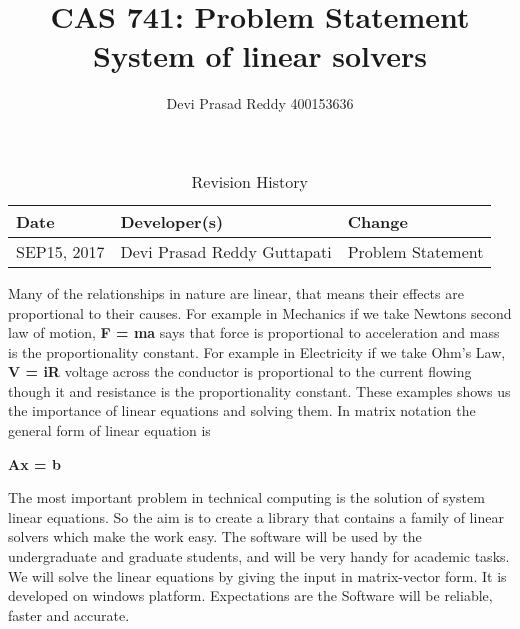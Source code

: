 \documentclass{article}
\title{CAS 741: Problem Statement\\System of linear solvers}
\author{Devi Prasad Reddy 400153636}
\date{}
\begin{document}
\maketitle

\begin{table}[hp]
\caption{Revision History} \label{TblRevisionHistory}
\begin{tabularx}{\textwidth}{llX}
\toprule
\textbf{Date} & \textbf{Developer(s)} & \textbf{Change}\\
\midrule
SEP15, 2017 & Devi Prasad Reddy Guttapati & Problem Statement\\

\bottomrule
\end{tabularx}
\end{table}


Many of the relationships in nature are linear, that means their effects are
proportional to their causes. For example in Mechanics if we take Newtons second
law of motion, \textbf{F = ma} says that force is proportional to acceleration
and mass is the proportionality constant. For example in Electricity if we take
Ohm's Law, \textbf{V = iR} voltage across the conductor is proportional to the
current flowing though it and resistance is the proportionality constant. These
examples shows us the importance of linear equations and solving them. In matrix
notation the general form of linear equation is

 \centerline{\textbf{Ax = b}}

The most important problem in technical computing is the solution of system
linear equations. So the aim is to create a library that contains a family of  linear solvers
which make the work easy. The software will be used by the undergraduate and
graduate students, and will be very handy for academic tasks. We will solve the
linear equations by giving the input in matrix-vector form. It is developed on
windows platform. Expectations are the Software will be reliable, faster and
accurate.
\end{document}
